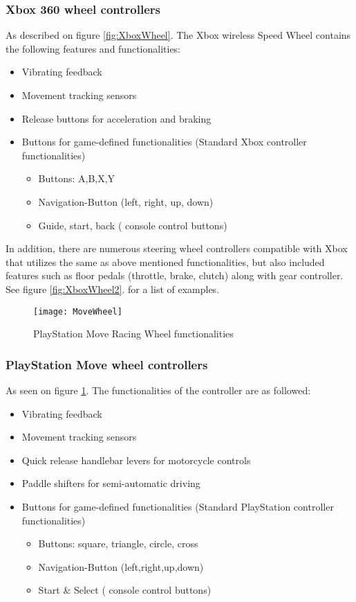 \subsubsection*{Xbox 360 wheel controllers}
\parencite{Xbox2013}\newline
As described on figure \ref{fig:XboxWheel}. The Xbox wireless Speed Wheel contains the following features and functionalities:

\begin{itemize}
\item Vibrating feedback
\item Movement tracking sensors
\item Release buttons for acceleration and braking
\item Buttons for game-defined functionalities (Standard Xbox controller functionalities)
	\begin{itemize}
		\item Buttons: A,B,X,Y
		\item Navigation-Button (left, right, up, down)
		\item Guide, start, back ( console control buttons)
	\end{itemize}
\end{itemize}

In addition, there are numerous steering wheel controllers compatible with Xbox that utilizes the same as above mentioned functionalities, but also included features such as floor pedals (throttle, brake, clutch) along with gear controller. See figure \ref{fig:XboxWheel2}. for a list of examples.
\bigskip

\begin{figure}[h]
\centering
\texttt{[image: MoveWheel]}
\caption{PlayStation Move Racing Wheel functionalities}
\label{fig:MoveWheel}
\end{figure}


\subsubsection*{PlayStation Move wheel controllers}
\parencite{Move2013}\newline
As seen on figure \ref{fig:MoveWheel}. The functionalities of the controller are as followed:

\begin{itemize}
\item Vibrating feedback
\item Movement tracking sensors
\item Quick release handlebar levers for motorcycle controls
\item Paddle shifters for semi-automatic driving
\item Buttons for game-defined functionalities (Standard PlayStation controller functionalities)
	\begin{itemize}
	\item Buttons: square, triangle, circle, cross
	\item Navigation-Button (left,right,up,down)
	\item Start \& Select ( console control buttons)
	\end{itemize}
\end{itemize}

